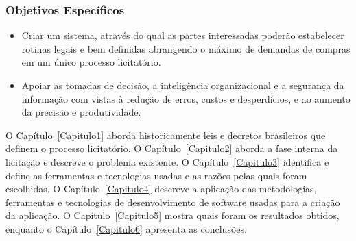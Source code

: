 \subsubsection*{Objetivos Específicos}
\begin{itemize}
    \item Criar um sistema, através do qual as partes interessadas poderão estabelecer rotinas legais e bem definidas abrangendo o máximo de demandas de compras em um único processo licitatório.
    \item Apoiar as tomadas de decisão, a inteligência organizacional e a segurança da informação com vistas à redução de erros, custos e desperdícios, e ao aumento da precisão e produtividade.
\end{itemize}

O Capítulo~\ref{Capitulo1} aborda historicamente leis e decretos brasileiros que definem o processo licitatório.
O Capítulo~\ref{Capitulo2} aborda a fase interna da licitação e descreve o problema existente.
O Capítulo~\ref{Capitulo3} identifica e define as ferramentas e tecnologias usadas e as razões pelas quais foram escolhidas.
O Capítulo~\ref{Capitulo4} descreve a aplicação das metodologias, ferramentas e tecnologias de desenvolvimento de software usadas para a criação da aplicação.
O Capítulo~\ref{Capitulo5} mostra quais foram os resultados obtidos, enquanto o Capítulo~\ref{Capitulo6} apresenta as conclusões.

